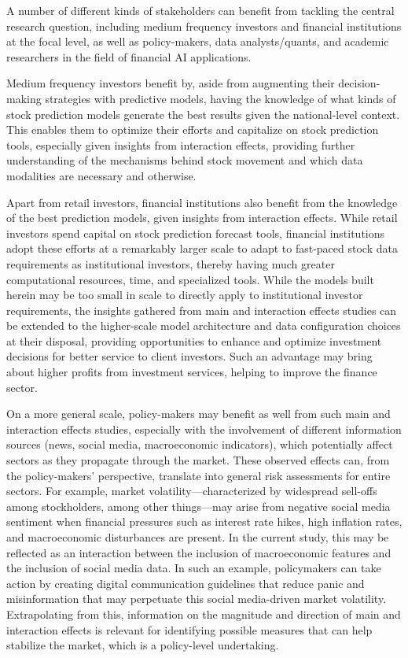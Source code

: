\documentclass[stu,floatsintext]{apa7}
\begin{document}
A number of different kinds of stakeholders can benefit from tackling the central research question, including medium frequency investors and financial institutions at the focal level, as well as policy-makers, data analysts/quants, and academic researchers in the field of financial AI applications.

Medium frequency investors benefit by, aside from augmenting their decision-making strategies with predictive models, having the knowledge of what kinds of stock prediction models generate the best results given the national-level context. This enables them to optimize their efforts and capitalize on stock prediction tools, especially given insights from interaction effects, providing further understanding of the mechanisms behind stock movement and which data modalities are necessary and otherwise.

Apart from retail investors, financial institutions also benefit from the knowledge of the best prediction models, given insights from interaction effects. While retail investors spend capital on stock prediction forecast tools, financial institutions adopt these efforts at a remarkably larger scale to adapt to fast-paced stock data requirements as institutional investors, thereby having much greater computational resources, time, and specialized tools. While the models built herein may be too small in scale to directly apply to institutional investor requirements, the insights gathered from main and interaction effects studies can be extended to the higher-scale model architecture and data configuration choices at their disposal, providing opportunities to enhance and optimize investment decisions for better service to client investors. Such an advantage may bring about higher profits from investment services, helping to improve the finance sector.

On a more general scale, policy-makers may benefit as well from such main and interaction effects studies, especially with the involvement of different information sources (news, social media, macroeconomic indicators), which potentially affect sectors as they propagate through the market. These observed effects can, from the policy-makers’ perspective, translate into general risk assessments for entire sectors. For example, market volatility—characterized by widespread sell-offs among stockholders, among other things—may arise from negative social media sentiment when financial pressures such as interest rate hikes, high inflation rates, and macroeconomic disturbances are present. In the current study, this may be reflected as an interaction between the inclusion of macroeconomic features and the inclusion of social media data. In such an example, policymakers can take action by creating digital communication guidelines that reduce panic and misinformation that may perpetuate this social media-driven market volatility. Extrapolating from this, information on the magnitude and direction of main and interaction effects is relevant for identifying possible measures that can help stabilize the market, which is a policy-level undertaking.
\end{document}
